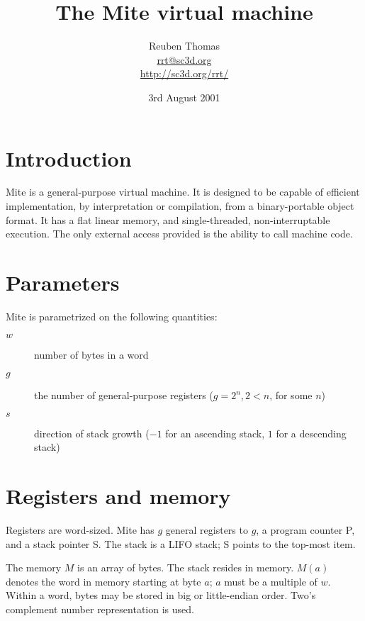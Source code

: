 \documentclass[english]{scrartcl}
\newcommand{\synfont}{\sffamily}
\newcommand{\syn}[1]{{\synfont #1}}
\begin{document}
\title{The Mite virtual machine}
\author{Reuben Thomas\\\url{rrt@sc3d.org}\\\url{http://sc3d.org/rrt/}}
\date{3rd August 2001}
\maketitle



\section{Introduction}

Mite is a general-purpose virtual machine. It is designed to be
capable of efficient implementation, by interpretation or compilation,
from a binary-portable object format. It has a flat linear memory, and
single-threaded, non-interruptable execution. The only external access
provided is the ability to call machine code.



\section{Parameters}

Mite is parametrized on the following quantities:

\begin{description}
\item[$w$]number of bytes in a word

\item[$g$]the number of general-purpose registers ($g=2^n, 2<n$, for
some $n$)

\item[$s$]direction of stack growth ($-1$ for an ascending stack, $1$
for a descending stack)
\end{description}



\section{Registers and memory}

Registers are word-sized. Mite has $g$ general registers \syn{1} to
$g$, a program counter \syn{P}, and a stack pointer \syn{S}. The stack
is a LIFO stack; \syn{S} points to the top-most item.

The memory $M$ is an array of bytes. The stack resides in memory. 
$M(a)$ denotes the word in memory starting at byte $a$; $a$ must be a
multiple of $w$. Within a word, bytes may be stored in big or
little-endian order. Two's complement number representation is used.
\end{document}
